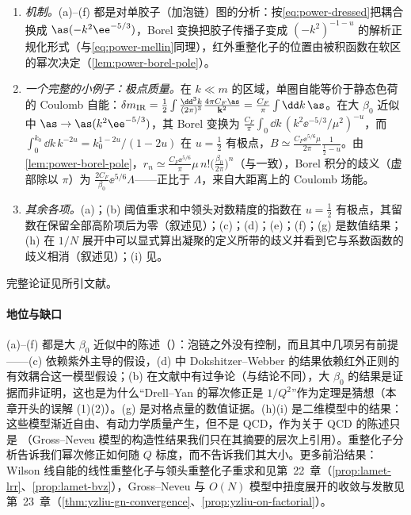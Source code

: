 \begin{proofsketch}
\begin{enumerate}[label=\arabic*.,leftmargin=1.6em,itemsep=1pt,topsep=2pt]
\item \emph{机制。}(a)--(f) 都是对单胶子（加泡链）图的分析：按\eqref{eq:power-dressed}把耦合换成 $\as(-k^2\ee^{-5/3})$，Borel 变换把胶子传播子变成 $(-k^2)^{-1-u}$ 的解析正规化形式（与\eqref{eq:power-mellin}同理），红外重整化子的位置由被积函数在软区的幂次决定（\cref{lem:power-borel-pole}）。
\item \emph{一个完整的小例子：极点质量。}在 $k\ll m$ 的区域，单圈自能等价于静态色荷的 Coulomb 自能：$\delta m_{\mathrm{IR}}=\frac12\int\frac{\dd^3k}{(2\pi)^3}\frac{4\pi C_F\as}{\mathbf k^2}=\frac{C_F}{\pi}\int\dd k\,\as$。在大 $\beta_0$ 近似中 $\as\to\as(k^2\ee^{-5/3})$，其 Borel 变换为 $\frac{C_F}{\pi}\int_0\dd k\,(k^2\ee^{-5/3}/\mu^2)^{-u}$，而 $\int_0^{k_0}\dd k\,k^{-2u}=k_0^{1-2u}/(1-2u)$ 在 $u=\frac12$ 有极点，$B\simeq\frac{C_F\ee^{5/6}\mu}{2\pi}\frac{1}{\frac12-u}$。由\cref{lem:power-borel-pole}，$r_n\simeq\frac{C_F\ee^{5/6}}{\pi}\mu\,n!\big(\frac{\beta_0}{2\pi}\big)^n$（与\cite[式~(5.84)]{Beneke1999}一致），Borel 积分的歧义（虚部除以 $\pi$）为 $\frac{2C_F}{\beta_0}\ee^{5/6}\Lambda$——正比于 $\Lambda$，来自大距离上的 Coulomb 场能。
\item \emph{其余各项。}(a)\cite{DasguptaWebber1996}；(b) 阈值重求和中领头对数精度的指数在 $u=\frac12$ 有极点，其留数在保留全部高阶项后为零\cite{BenekeBraun1995b}（叙述见\cite[第~5.3.4~节]{Beneke1999}）；(c)\cite{BenekeBraunMagnea1997}；(d)\cite{DokshitzerWebber1995,Korchemsky:1994is}；(e)\cite{Bigi:1994em,Beneke:1994sw}；(f)\cite{Braun:2018brg}；(g) 是数值结果\cite{Bali:2014fea}；(h) 在 $1/N$ 展开中可以显式算出凝聚的定义所带的歧义并看到它与系数函数的歧义相消\cite{David:1982qv,Beneke:1998eq}（叙述见\cite[第~4.1~节]{Beneke1999}）；(i) 见\cite{Feldman:1986ax,Gawedzki:1985ez}。
\end{enumerate}
完整论证见所引文献。
\end{proofsketch}

\paragraph{地位与缺口}
(a)--(f) 都是大 $\beta_0$ 近似中的陈述（\tagP）：泡链之外没有控制，而且其中几项另有前提——(c) 依赖紫外主导的假设，(d) 中 Dokshitzer--Webber 的结果依赖红外正则的有效耦合这一模型假设；(b) 在文献中有过争论（\cite{Korchemsky:1994is}与\cite{BenekeBraun1995b}结论不同），大 $\beta_0$ 的结果是证据而非证明，这也是为什么“Drell--Yan 的幂次修正是 $1/Q^2$”作为定理是猜想（本章开头的误解 (1)(2)）。(g) 是对格点量的数值证据。(h)(i) 是二维模型中的结果：这些模型渐近自由、有动力学质量产生，但不是 QCD，作为关于 QCD 的陈述只是 \tagP（Gross--Neveu 模型的构造性结果我们只在其摘要的层次上引用）。重整化子分析告诉我们幂次修正如何随 $Q$ 标度，而不告诉我们其大小\cite[第~4.2.1~节]{Beneke1999}。更多前沿结果：Wilson 线自能的线性重整化子与领头重整化子重求和见第~22~章（\cref{prop:lamet-lrr}、\cref{prop:lamet-bvz}），Gross--Neveu 与 $O(N)$ 模型中扭度展开的收敛与发散见第~23~章（\cref{thm:yzliu-gn-convergence}、\cref{prop:yzliu-on-factorial}）。

